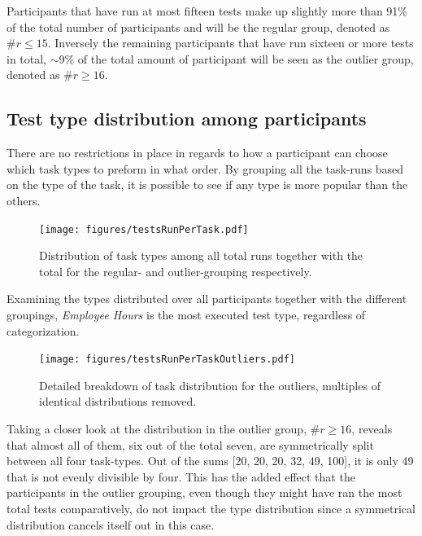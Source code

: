 \documentclass[nofilelist,dvipsnames]{cslthse-msc}
\begin{document}
        Participants that have run at most fifteen tests make up slightly more
        than 91\% of the total number of participants and will be the regular
        group, denoted as $\#r\leq15$. Inversely the remaining participants
        that have run sixteen or more tests in total, $\sim$9\% of the total
        amount of participant will be seen as the outlier group, denoted as
        $\#r\geq16$.

      \subsection{Test type distribution among participants}

        There are no restrictions in place in regards to how a participant
        can choose which task types to preform in what order. By grouping all
        the task-runs based on the type of the task, it is possible to see if
        any type is more popular than the others.

				\begin{figure}[h!]
					\centering
					\texttt{[image: figures/testsRunPerTask.pdf]}
          \caption{
            Distribution of task types among all total runs together with the
            total for the regular- and outlier-grouping respectively.
          }
				\end{figure}

        Examining the types distributed over all participants together
        with the different groupings, \textit{Employee Hours} is the most
        executed test type, regardless of categorization.

				\begin{figure}[h!]
					\centering
					\texttt{[image: figures/testsRunPerTaskOutliers.pdf]}
          \caption{
            Detailed breakdown of task distribution for the outliers, multiples
            of identical distributions removed.
          }
          \label{label_testsRunPerTaskOutliers}
				\end{figure}

        Taking a closer look at the distribution in the outlier group,
        $\#r\geq16$, reveals that almost all of them, six out of the total seven,
        are symmetrically split between all four task-types. Out of the sums
        [20, 20, 20, 32, 49, 100], it is only 49 that is not evenly divisible
        by four. This has the added effect that the participants in the
        outlier grouping, even though they might have ran the most total tests
        comparatively, do not impact the type distribution since a symmetrical
        distribution cancels itself out in this case.
\end{document}
